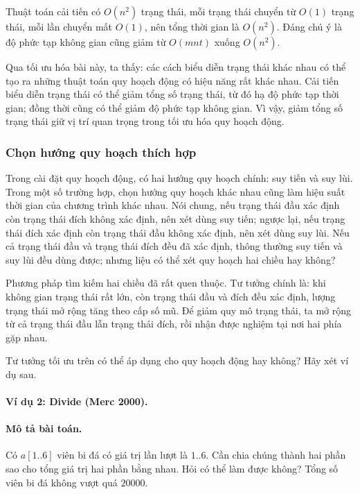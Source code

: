 \documentclass[11pt]{article}
\begin{document}
Thuật toán cải tiến có \(O(n^2)\) trạng thái, mỗi trạng thái chuyển từ
\(O(1)\) trạng thái, mỗi lần chuyển mất \(O(1)\), nên tổng thời gian là
\(O(n^2)\). Đáng chú ý là độ phức tạp không gian cũng giảm từ \(O(mnt)\)
xuống \(O(n^2)\).

Qua tối ưu hóa bài này, ta thấy: các cách biểu diễn trạng thái khác nhau có
thể tạo ra những thuật toán quy hoạch động có hiệu năng rất khác nhau. Cải
tiến biểu diễn trạng thái có thể giảm tổng số trạng thái, từ đó hạ độ phức
tạp thời gian; đồng thời cũng có thể giảm độ phức tạp không gian. Vì vậy,
giảm tổng số trạng thái giữ vị trí quan trọng trong tối ưu hóa quy hoạch
động.

\subsubsection{Chọn hướng quy hoạch thích hợp}

Trong cài đặt quy hoạch động, có hai hướng quy hoạch chính: suy tiến và suy
lùi. Trong một số trường hợp, chọn hướng quy hoạch khác nhau cũng làm hiệu
suất thời gian của chương trình khác nhau. Nói chung, nếu trạng thái đầu xác
định còn trạng thái đích không xác định, nên xét dùng suy tiến; ngược lại,
nếu trạng thái đích xác định còn trạng thái đầu không xác định, nên xét dùng
suy lùi. Nếu cả trạng thái đầu và trạng thái đích đều đã xác định, thông
thường suy tiến và suy lùi đều dùng được; nhưng liệu có thể xét quy hoạch hai
chiều hay không?

Phương pháp tìm kiếm hai chiều đã rất quen thuộc. Tư tưởng chính là: khi
không gian trạng thái rất lớn, còn trạng thái đầu và đích đều xác định, lượng
trạng thái mở rộng tăng theo cấp số mũ. Để giảm quy mô trạng thái, ta mở rộng
từ cả trạng thái đầu lẫn trạng thái đích, rồi nhận được nghiệm tại nơi hai
phía gặp nhau.

Tư tưởng tối ưu trên có thể áp dụng cho quy hoạch động hay không? Hãy xét ví
dụ sau.

\paragraph{Ví dụ 2: Divide (Merc 2000).}

\paragraph{Mô tả bài toán.}
Có \(a[1..6]\) viên bi đá có giá trị lần lượt là \(1..6\). Cần chia chúng
thành hai phần sao cho tổng giá trị hai phần bằng nhau. Hỏi có thể làm được
không? Tổng số viên bi đá không vượt quá \(20000\).
\end{document}

